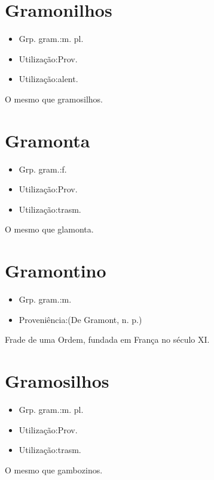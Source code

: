 \section{Gramonilhos}
\begin{itemize}
\item {Grp. gram.:m. pl.}
\end{itemize}
\begin{itemize}
\item {Utilização:Prov.}
\end{itemize}
\begin{itemize}
\item {Utilização:alent.}
\end{itemize}
O mesmo que \textunderscore gramosilhos\textunderscore .
\section{Gramonta}
\begin{itemize}
\item {Grp. gram.:f.}
\end{itemize}
\begin{itemize}
\item {Utilização:Prov.}
\end{itemize}
\begin{itemize}
\item {Utilização:trasm.}
\end{itemize}
O mesmo que \textunderscore glamonta\textunderscore .
\section{Gramontino}
\begin{itemize}
\item {Grp. gram.:m.}
\end{itemize}
\begin{itemize}
\item {Proveniência:(De \textunderscore Gramont\textunderscore , n. p.)}
\end{itemize}
Frade de uma Ordem, fundada em França no século XI.
\section{Gramosilhos}
\begin{itemize}
\item {Grp. gram.:m. pl.}
\end{itemize}
\begin{itemize}
\item {Utilização:Prov.}
\end{itemize}
\begin{itemize}
\item {Utilização:trasm.}
\end{itemize}
O mesmo que \textunderscore gambozinos\textunderscore .
